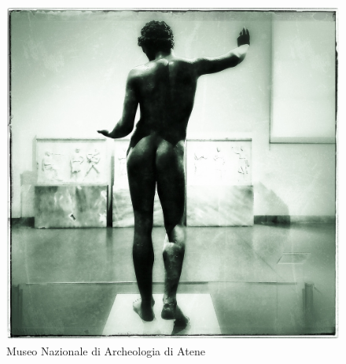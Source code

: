 \documentclass[nols]{tufte-handout}
\begin{document}
\begin{figure}[!b]
  \includegraphics{thumb-lesson_VII.jpeg}
  \caption{Museo Nazionale di Archeologia di Atene}
  \label{fig:textfig}
\end{figure}

 


\end{document}
